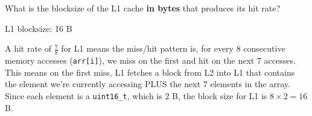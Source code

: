 \begin{blocksection}
\question
What is the blocksize of the L1 cache ​\textbf{in bytes}​ that produces its hit rate?

\begin{solution}[0.7in]
L1 blocksize: ​16 B

A hit rate of $\frac{7}{8}$ for L1 means the miss/hit pattern is, for every $8$ consecutive memory accesses (\lstinline$arr[i]$), we miss on the first and hit on the next $7$ accesses. This means on the first miss, L1 fetches a block from L2 into L1 that contains the element we’re currently accessing PLUS the next 7 elements in the array. Since each element is a \lstinline$uint16_t$, which is $2$ B, the block size for L1 is $8 \times 2 = 16$ B.
\end{solution}

\end{blocksection}